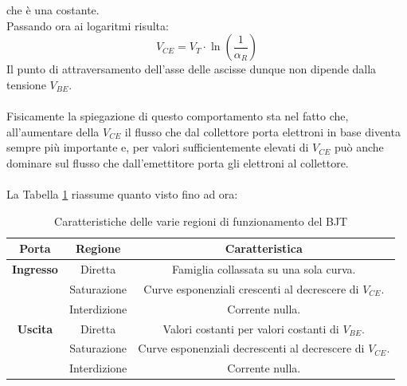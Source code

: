\documentclass[../main.tex]{subfiles}
\begin{document}
	che è una costante. \\
	Passando ora ai logaritmi risulta:
	$$V _ { C E } = V _ { T } \cdot \ln \left( \frac { 1 } { \alpha _ { R } } \right)$$
	Il punto di attraversamento dell’asse delle ascisse dunque non dipende dalla tensione $V_{BE}$.\\\\
	Fisicamente la spiegazione di questo comportamento sta nel fatto che, all’aumentare della $V_{CE}$ il flusso che dal collettore porta elettroni in base diventa sempre più importante e, per valori sufficientemente elevati di $V_{CE}$ può anche dominare sul flusso che dall’emettitore porta gli elettroni al collettore.\\\\
	La Tabella \ref{tab:table-6} riassume quanto visto fino ad ora:
	\begin{table}[ht]
		\centering
		\begin{tabular}{|c|c|c|}
			\hline
			\textbf{Porta} & \textbf{Regione} & \textbf{Caratteristica} \\
			\hline
			\textbf{Ingresso} & Diretta & Famiglia collassata su una sola curva. \\
			\hline
			& Saturazione & Curve esponenziali crescenti al decrescere di $V_{CE}$. \\
			\hline
			& Interdizione & Corrente nulla. \\
			\hline
			\textbf{Uscita} & Diretta & Valori costanti per valori costanti di $V_{BE}$. \\
			\hline
			& Saturazione & Curve esponenziali decrescenti al decrescere di $V_{CE}$. \\
			\hline
			& Interdizione & Corrente nulla. \\
			\hline
		\end{tabular}
		\caption{Caratteristiche delle varie regioni di funzionamento del BJT}
		\label{tab:table-6}
	\end{table}
\end{document}

